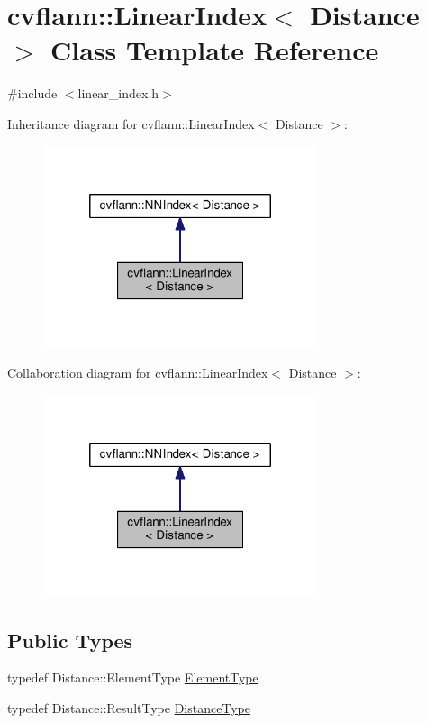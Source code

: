 \hypertarget{classcvflann_1_1LinearIndex}{\section{cvflann\-:\-:Linear\-Index$<$ Distance $>$ Class Template Reference}
\label{classcvflann_1_1LinearIndex}
}


{\ttfamily \#include $<$linear\-\_\-index.\-h$>$}



Inheritance diagram for cvflann\-:\-:Linear\-Index$<$ Distance $>$\-:\nopagebreak
\begin{figure}[H]
\begin{center}
\leavevmode
\includegraphics[width=228pt]{classcvflann_1_1LinearIndex__inherit__graph}
\end{center}
\end{figure}


Collaboration diagram for cvflann\-:\-:Linear\-Index$<$ Distance $>$\-:\nopagebreak
\begin{figure}[H]
\begin{center}
\leavevmode
\includegraphics[width=228pt]{classcvflann_1_1LinearIndex__coll__graph}
\end{center}
\end{figure}
\subsection*{Public Types}
\begin{DoxyCompactItemize}
\item 
typedef Distance\-::\-Element\-Type \hyperlink{classcvflann_1_1LinearIndex_a7a42eebeec43b6f10fd8e2ffb6516959}{Element\-Type}
\item 
typedef Distance\-::\-Result\-Type \hyperlink{classcvflann_1_1LinearIndex_a2856b8b90987bac8737fdb08b5ad693f}{Distance\-Type}
\end{DoxyCompactItemize}
